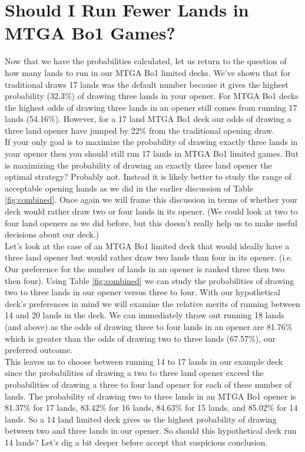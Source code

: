 \documentclass[oneside]{book}   %
\begin{document}
\section{Should I Run Fewer Lands in MTGA Bo1 Games?}

Now that we have the probabilities calculated, let us return to the question of how many lands to run in our MTGA Bo1 limited decks. We've shown that for traditional draws 17 lands was the default number because it gives the highest probability (32.3\%) of drawing three lands in your opener. For MTGA Bo1 decks the highest odds of drawing three lands in an opener still comes from running 17 lands (54.16\%). However, for a 17 land MTGA Bo1 deck our odds of drawing a three land opener have jumped by 22\% from the traditional opening draw. \\

If your only goal is to maximize the probability of drawing exactly three lands in your opener then you should still run 17 lands in MTGA Bo1 limited games. But is maximizing the probability of drawing an exactly three land opener the optimal strategy? Probably not. Instead it is likely better to study the range of acceptable opening hands as we did in the earlier discussion of Table \ref{fig:combined}. Once again we will frame this discussion in terms of whether your deck would rather draw two or four lands in its opener. (We could look at two to four land openers as we did before, but this doesn't really help us to make useful decisions about our deck.) \\

Let's look at the case of an MTGA Bo1 limited deck that would ideally have a three land opener but would rather draw two lands than four in its opener. (i.e. Our preference for the number of lands in an opener is ranked three then two then four). Using Table \ref{fig:combined} we can study the probabilities of drawing two to three lands in our opener versus three to four. With our hypothetical deck's preferences in mind we will examine the relative merits of running between 14 and 20 lands in the deck. We can immediately throw out running 18 lands (and above) as the odds of drawing three to four lands in an opener are 81.76\% which is greater than the odds of drawing two to three lands (67.57\%), our preferred outcome. \\

This leaves us to choose between running 14 to 17 lands in our example deck since the probabilities of drawing a two to three land opener exceed the probabilities of drawing a three to four land opener for each of these number of lands. The probability of drawing two to three lands in an MTGA Bo1 opener is 81.37\% for 17 lands, 83.42\% for 16 lands, 84.63\% for 15 lands, and 85.02\% for 14 lands. So a 14 land limited deck gives us the highest probability of drawing between two and three lands in our opener. So should this hypothetical deck run 14 lands? Let's dig a bit deeper before accept that suspicious conclusion. \\
\end{document}
